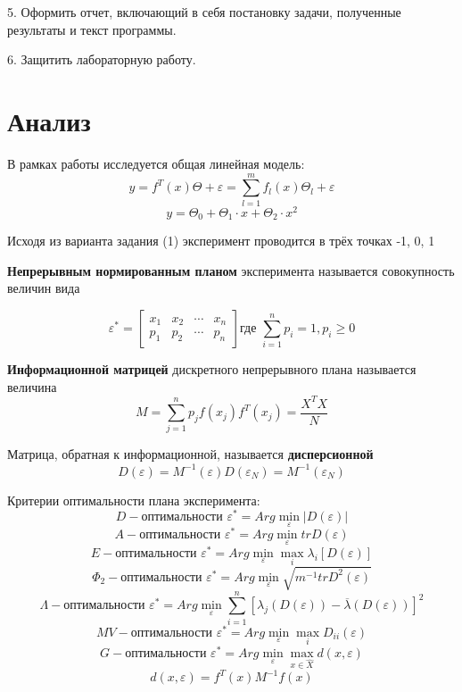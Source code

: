 5.	Оформить отчет, включающий в себя постановку задачи, полученные результаты и текст программы.

6.	Защитить лабораторную работу. 


\section{Анализ}

В рамках работы исследуется общая линейная модель:
\[ y = f^T(x)\Theta + \varepsilon = \sum_{l=1}^m f_l(x)\Theta_l + \varepsilon \]
\[ y = \Theta_0 + \Theta_1 \cdot x + \Theta_2 \cdot x^2 \]

Исходя из варианта задания (1) эксперимент проводится в трёх точках -1, 0, 1

{\bf Непрерывным нормированным планом} эксперимента называется совокупность величин вида

\[
	\varepsilon^*=
	\begin{bmatrix}
	    x_1		&	x_2		&	\cdots		&	x_n	\\
 	    p_1		&	p_2		&	\cdots		&	p_n
	\end{bmatrix}
	\text{где } \sum_{i=1}^n p_i = 1, p_i \geq 0
\] 

{\bf Информационной матрицей} дискретного непрерывного плана называется величина
\[M = \sum_{j=1}^n p_j f(x_j)f^T(x_j) = \frac{X^T X}{N}\]

Матрица, обратная к информационной, называется {\bf дисперсионной}
\[ D(\varepsilon)=M^{-1}(\varepsilon) D(\varepsilon_N)=M^{-1}(\varepsilon_N) \]

Критерии оптимальности плана эксперимента:
\[ D-\text{оптимальности } \varepsilon^* = Arg \min_{\varepsilon} |D(\varepsilon)| \]
\[ A-\text{оптимальности } \varepsilon^* = Arg \min_{\varepsilon} tr D(\varepsilon) \]
\[ E-\text{оптимальности } \varepsilon^* = Arg \min_{\varepsilon} \max_i \lambda_i[D(\varepsilon)] \]
\[ \Phi_2-\text{оптимальности } \varepsilon^* = Arg \min_{\varepsilon} \sqrt{m^{-1} tr D^2(\varepsilon)} \]
\[ \Lambda-\text{оптимальности } \varepsilon^* = Arg \min_{\varepsilon} \sum_{i=1}^n [ \lambda_j(D(\varepsilon)) - \overline{\lambda}(D(\varepsilon)) ]^2 \]
\[ MV-\text{оптимальности } \varepsilon^* = Arg \min_{\varepsilon} \max_i D_{ii}(\varepsilon) \]
\[ G-\text{оптимальности } \varepsilon^* = Arg \min_{\varepsilon} \max_{x \in \hat{X}} d(x, \varepsilon) \]
\[ d(x, \varepsilon) = f^T(x) M^{-1} f(x) \]


